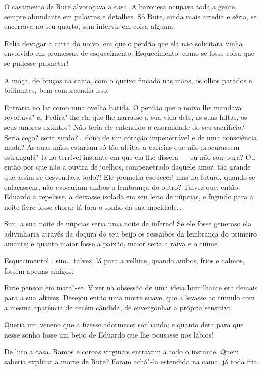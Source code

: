 O casamento de Rute alvoroçava a casa. A baronesa ocupava toda a gente,
sempre abundante em palavras e detalhes. Só Rute, ainda mais arredia e
séria, se encerrava no seu quarto, sem intervir em coisa alguma.

Relia devagar a carta do noivo, em que o perdão que ela não solicitara
vinha envolvido em promessas de esquecimento. Esquecimento! como se
fosse coisa que se pudesse prometer!

A moça, de bruços na cama, com o queixo fincado nas mãos, os olhos
parados e brilhantes, bem compreendia isso.

Entraria no lar como uma ovelha batida. O perdão que o noivo lhe mandava
revoltava"-a. Pedira"-lhe ela que lhe narrasse a sua vida dele, as suas
faltas, os seus amores extintos? Não teria ele entendido a enormidade do
seu sacrifício? Seria cego? seria surdo?\ldots{} dono de um coração
impenetrável e de uma consciência muda? As suas mãos estariam só tão
afeitas a carícias que não procurassem estrangulá"-la no terrível
instante em que ela lhe dissera --- eu não sou pura? Ou então por que
não a ouvira de joelhos, compenetrado daquele amor, tão grande que assim
se desvendava todo?! Ele prometia esquecer! mas no futuro, quando se
enlaçassem, não evocariam ambos a lembrança do outro? Talvez que, então,
Eduardo a repelisse, a deixasse isolada em seu leito de núpcias, e
fugindo para a noite livre fosse chorar lá fora o sonho da sua
mocidade\ldots{}

Sim, a sua noite de núpcias seria uma noite de inferno! Se ele fosse
generoso ela adivinharia através da doçura do seu beijo os ressaibos da
lembrança do primeiro amante; e quanto maior fosse a paixão, maior seria
a raiva e o ciúme.

Esquecimento!\ldots{} sim\ldots{} talvez, lá para a velhice, quando ambos, frios e
calmos, fossem apenas amigos.

Rute pensou em mata"-se. Viver na obsessão de uma ideia humilhante era
demais para a sua altivez. Desejou então uma morte suave, que a levasse
ao túmulo com a mesma aparência de cecém cândida, de envergonhar a
própria sensitiva.

Queria um veneno que a fizesse adormecer sonhando; e quanto dera para
que nesse sonho fosse um beijo de Eduardo que lhe pousasse nos lábios!

\asterisc

De luto a casa. Ramos e coroas virginais entravam a todo o instante.
Quem saberia explicar a morte de Rute? Foram achá"-la estendida na cama,
já toda fria.

